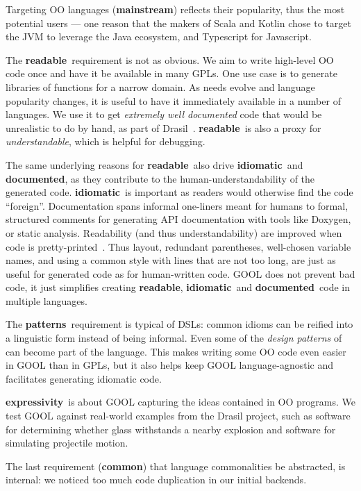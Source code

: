 \documentclass[sigplan,review,prologue,dvipsnames]{acmart}
\newcommand{\abbrev}[1]{\textbf{#1}}
\newcommand{\mainstream}{\abbrev{mainstream}}
\newcommand{\readable}{\abbrev{readable}}
\newcommand{\idiomatic}{\abbrev{idiomatic}}
\newcommand{\documented}{\abbrev{documented}}
\newcommand{\oopatterns}{\abbrev{patterns}}
\newcommand{\common}{\abbrev{common}}
\newcommand{\expressivity}{\abbrev{expressivity}}
\begin{document}
Targeting OO languages (\mainstream) reflects their popularity,
thus the most potential users --- one reason that the makers
of Scala and Kotlin chose to target the JVM to leverage the Java ecosystem, and
Typescript for Javascript.

The \readable~requirement is not as obvious.  We aim to write
high-level OO code once and have it be available in many GPLs. One use case
is to generate libraries of functions for a narrow domain. As needs
evolve and language popularity changes, it is useful to have it immediately
available in a number of languages. We use it to get \emph{extremely well
documented} code that would be unrealistic to do by hand, as part of
Drasil~\cite{SzymczakEtAl2016, Drasil2019}. \readable~is 
also a proxy for \emph{understandable}, which is helpful for debugging.

The same underlying reasons for \readable~also drive \idiomatic~and \documented,
as they contribute to the human-understandability of the generated code.
\idiomatic~is important as readers would otherwise find the code ``foreign''.
Documentation spans informal one-liners meant for humans to
formal, structured comments for generating API documentation with tools
like Doxygen, or static analysis.
Readability (and thus understandability) are improved when code is 
pretty-printed~\cite{buse2009learning}. Thus layout, redundant parentheses,
well-chosen variable names, and using a common style with lines that are not too
long, are just as useful for generated code as for human-written code.
GOOL does not prevent bad code, it just simplifies creating \readable,
\idiomatic~and \documented~code in multiple languages.

The \oopatterns~requirement is typical of DSLs: common idioms
can be reified into a linguistic form instead of being
informal. Even some of the \emph{design patterns} of~\cite{gamma1995design}
can become part of the language. This makes writing some OO
code even easier in GOOL than in GPLs, but it also helps
keep GOOL language-agnostic and facilitates generating idiomatic code.

\expressivity~is about GOOL capturing
the ideas contained in OO programs.  We test 
GOOL against real-world examples from the Drasil project, such as 
software for determining whether glass withstands a nearby explosion and 
software for simulating projectile motion.

The last requirement (\common) that language commonalities be abstracted, is
internal: we noticed too much code duplication in our initial
backends.
\end{document}
